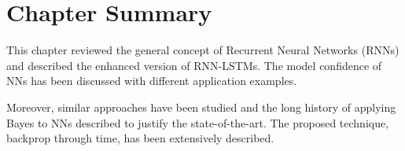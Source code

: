 \section{Chapter Summary}
This chapter reviewed the general concept of Recurrent Neural Networks (RNNs) and described the enhanced version of RNN-LSTMs. The model confidence of NNs has been discussed with different application examples. 

Moreover, similar approaches have been studied and the long history of applying Bayes to NNs described to justify the state-of-the-art. The proposed technique, backprop through time, has been extensively described.